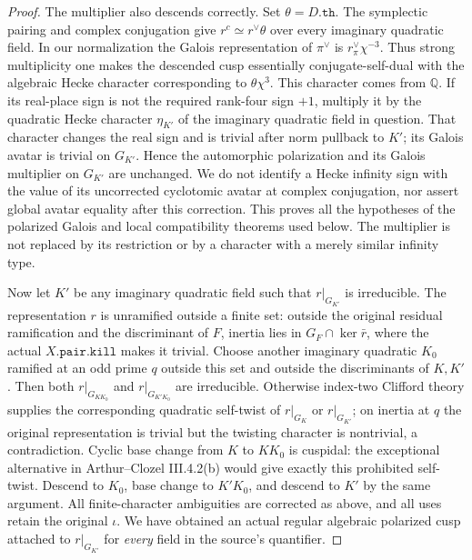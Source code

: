 \begin{proof}
The multiplier also descends correctly.  Set
$\theta=D.\texttt{th}$.  The symplectic pairing
and complex conjugation give
$r^c\simeq r^\vee\theta$ over every imaginary
quadratic field.  In our normalization the
Galois representation of $\pi^\vee$ is
$r_\pi^\vee\chi^{-3}$.  Thus strong multiplicity
one makes the descended cusp essentially
conjugate-self-dual with the algebraic Hecke
character corresponding to $\theta\chi^3$.
This character comes from $\mathbb Q$.  If its
real-place sign is not the required rank-four
sign $+1$, multiply it by the quadratic Hecke
character $\eta_{K'}$ of the imaginary quadratic
field in question.  That character changes the
real sign and is trivial after norm pullback
to $K'$; its Galois avatar is trivial on
$G_{K'}$.  Hence the automorphic polarization
and its Galois multiplier on $G_{K'}$ are
unchanged.  We do not identify a Hecke infinity
sign with the value of its uncorrected
cyclotomic avatar at complex conjugation, nor
assert global avatar equality after this
correction.  This proves all
the hypotheses of the polarized Galois and local
compatibility theorems used below.  The multiplier
is not replaced by its restriction or by a
character with a merely similar infinity type.

Now let $K'$ be any imaginary quadratic field
such that $r|_{G_{K'}}$ is irreducible.  The
representation $r$ is unramified outside a finite
set: outside the original residual ramification
and the discriminant of $F$, inertia lies in
$G_F\cap\ker\bar r$, where the actual
$X.\texttt{pair.kill}$ makes it trivial.
Choose another imaginary quadratic $K_0$ ramified
at an odd prime $q$ outside this set and outside
the discriminants of $K,K'$.
Then both $r|_{G_{KK_0}}$ and
$r|_{G_{K'K_0}}$ are irreducible.  Otherwise
index-two Clifford theory supplies the corresponding
quadratic self-twist of $r|_{G_K}$ or
$r|_{G_{K'}}$; on inertia at $q$ the original
representation is trivial but the twisting
character is nontrivial, a contradiction.
Cyclic base change from $K$ to $KK_0$ is
cuspidal: the exceptional alternative in
Arthur--Clozel III.4.2(b) would give exactly
this prohibited self-twist.
Descend to $K_0$, base change to $K'K_0$, and
descend to $K'$ by the same argument.  All
finite-character ambiguities are corrected as
above, and all uses retain the original $\iota$.
We have obtained an actual regular algebraic
polarized cusp attached to $r|_{G_{K'}}$ for
\emph{every} field in the source's quantifier.


\end{proof}
